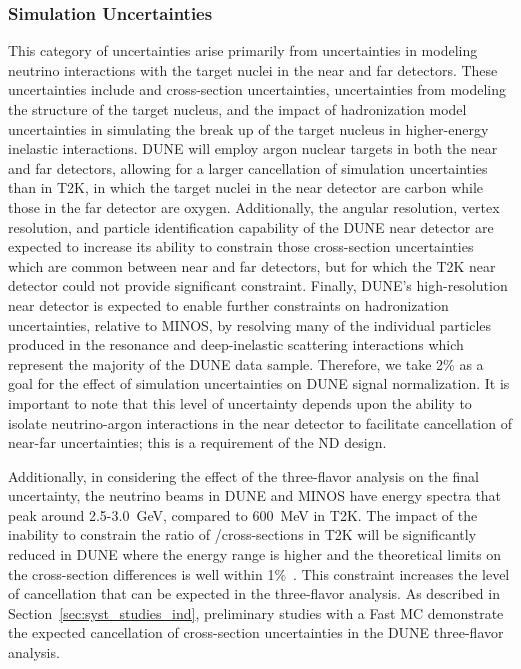 \subsubsection{Simulation Uncertainties}
\label{sec:syst_just_sim}
This category of uncertainties arise primarily from uncertainties in modeling neutrino interactions with the target
nuclei in the near and far detectors. These uncertainties include \nue and \numu cross-section uncertainties,
uncertainties from modeling the structure of the target nucleus, and the impact of
hadronization model uncertainties in simulating the break up of the target nucleus in higher-energy inelastic
interactions. DUNE will employ argon nuclear targets in both the near and far detectors, allowing for a larger
cancellation of simulation uncertainties than in T2K, in which the target nuclei in the near detector are
carbon while those in the far detector are oxygen. Additionally, the angular resolution, vertex resolution,
and particle identification capability of the DUNE near detector are expected to increase its ability to
constrain those cross-section uncertainties which are common between near and far detectors, but for which
the T2K near detector could not provide significant constraint.
Finally, DUNE's high-resolution near
detector is expected to enable further constraints on hadronization uncertainties, relative to MINOS, by
resolving many of the individual particles produced in the resonance and deep-inelastic scattering interactions
which represent the majority of the DUNE data sample. Therefore, we take 2\% as a goal for the effect of
simulation uncertainties on DUNE \nue signal normalization. It is important to note that this level of
uncertainty depends upon the ability to isolate neutrino-argon interactions in the near detector to facilitate
cancellation of near-far uncertainties; this is a requirement of the ND design.

Additionally, in considering the effect of the three-flavor analysis on the final uncertainty,
the neutrino beams in DUNE and MINOS have energy
spectra that peak around 2.5-3.0~GeV, compared to 600~MeV in T2K. The impact of the inability to
constrain the ratio of \nue/\numu cross-sections in T2K will be significantly reduced in DUNE
where the energy range is higher and the theoretical limits on the cross-section differences is
well within 1\%~\cite{DanSaidSo}. This constraint increases
the level of cancellation that can be expected in the three-flavor analysis. As
described in Section~\ref{sec:syst_studies_ind}, preliminary studies with a Fast MC demonstrate the
expected cancellation of cross-section uncertainties in the DUNE three-flavor analysis.

